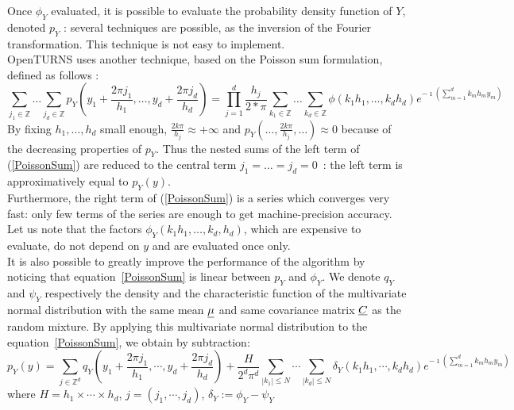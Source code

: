 {  Once $ \phi_Y$ evaluated, it is possible to evaluate the probability density function of $Y$, denoted $p_Y$ : several techniques are possible, as the inversion of the Fourier transformation. This technique is not easy to implement.\\
  OpenTURNS uses another technique, based on the Poisson sum formulation, defined as follows :
  \begin{equation}
    \displaystyle \sum_{j_1\in\mathbb{Z}}\hdots\sum_{j_d\in\mathbb{Z}} p_Y\left(y_1+\frac{2\pi j_1}{h_1},\hdots,y_d+\frac{2\pi j_d}{h_d}\right)=
    \prod_{j=1}^d \frac{h_j}{2*\pi}\sum_{k_1\in\mathbb{Z}}\hdots\sum_{k_d\in\mathbb{Z}}\phi\left(k_1h_1,\hdots,k_dh_d\right)e^{-\imath(\sum_{m=1}^{d}k_m h_m y_m)}
    \label{PoissonSum}
  \end{equation}
  By fixing $h_1,\hdots,h_d$ small enough, $\frac{2k\pi}{h_j} \approx +\infty$ and $p_Y(\hdots,\frac{2k\pi}{h_j},\hdots) \approx 0$ because of the decreasing properties of $p_Y$.
  Thus the nested sums of the left term of (\ref{PoissonSum}) are reduced to the central term $j_1=\hdots=j_d = 0$~: the left term is approximatively equal to $p_Y(y)$.\\
  Furthermore, the right term of (\ref{PoissonSum}) is a series which converges very fast: only few terms of the series are enough to get machine-precision accuracy. 
  Let us note that the factors $\phi_Y(k_1 h_1,\hdots,k_d,h_d)$, which are expensive to evaluate, do not depend on $y$ and are evaluated once only.\\
  \vspace*{2mm}
  It is also possible to greatly improve the performance of the algorithm by noticing that equation~\eqref{PoissonSum} is linear between $p_Y$
  and $\phi_Y$. We denote $q_Y$ and $\psi_Y$ respectively the density and the characteristic function of the multivariate normal distribution with the
  same mean ${\underline{\mu}}$ and same covariance matrix ${\underline{C}}$ as the random mixture. By applying this multivariate normal distribution to the equation~\eqref{PoissonSum}, we obtain by subtraction:
  \begin{equation}
  \displaystyle  p_Y\left(y\right) = \sum_{j\in\mathbb{Z}^d} q_Y\left(y_1+\frac{2\pi j_1}{h_1},\cdots,y_d+\frac{2\pi j_d}{h_d}\right)+
  \frac{H}{2^d\pi^d}\sum_{|k_1|\leq N}\cdots\sum_{|k_d|\leq N} \delta_Y\left(k_1h_1,\cdots,k_dh_d\right)e^{-\imath(\sum_{m=1}^{d}k_m h_m y_m)}
  \label{algoPoisson}
  \end{equation}
  where $H = h_1\times\cdots\times h_d$, $j=(j_1,\cdots,j_d)$, $\delta_Y:=\phi_Y - \psi_Y$\\

}
